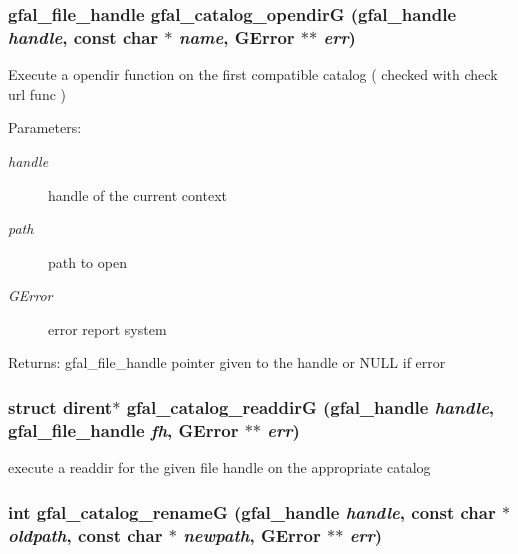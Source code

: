 \subsubsection{\setlength{\rightskip}{0pt plus 5cm}gfal\_\-file\_\-handle gfal\_\-catalog\_\-opendir\-G (gfal\_\-handle {\em handle}, const char $\ast$ {\em name}, GError $\ast$$\ast$ {\em err})}\label{gfal__common__catalog_8c_eb89b1d37a16ef8ecb50ac603366285c}


Execute a opendir function on the first compatible catalog ( checked with check url func ) \begin{Desc}
\item[Parameters:]
\begin{description}
\item[{\em handle}]handle of the current context \item[{\em path}]path to open \item[{\em GError}]error report system \end{description}
\end{Desc}
\begin{Desc}
\item[Returns:]gfal\_\-file\_\-handle pointer given to the handle or NULL if error \end{Desc}
\subsubsection{\setlength{\rightskip}{0pt plus 5cm}struct dirent$\ast$ gfal\_\-catalog\_\-readdir\-G (gfal\_\-handle {\em handle}, gfal\_\-file\_\-handle {\em fh}, GError $\ast$$\ast$ {\em err})}\label{gfal__common__catalog_8c_9ba0d48d73fe53d42d3a715e57473adb}


execute a readdir for the given file handle on the appropriate catalog 
\subsubsection{\setlength{\rightskip}{0pt plus 5cm}int gfal\_\-catalog\_\-rename\-G (gfal\_\-handle {\em handle}, const char $\ast$ {\em oldpath}, const char $\ast$ {\em newpath}, GError $\ast$$\ast$ {\em err})}\label{gfal__common__catalog_8c_99ffb13510951a6fe79f3c33305ea189}


